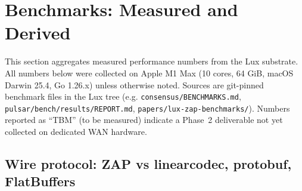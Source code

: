 
\section{Benchmarks: Measured and Derived}
\label{sec:benchmarks}

This section aggregates measured performance numbers from the Lux substrate.
All numbers below were collected on Apple M1 Max (10 cores, 64 GiB, macOS
Darwin 25.4, Go 1.26.x) unless otherwise noted. Sources are git-pinned
benchmark files in the Lux tree (e.g. \texttt{consensus/BENCHMARKS.md},
\texttt{pulsar/bench/results/REPORT.md},
\texttt{papers/lux-zap-benchmarks/}). Numbers reported as
``TBM'' (to be measured) indicate a Phase~2 deliverable not yet collected
on dedicated WAN hardware.

\subsection{Wire protocol: ZAP vs linearcodec, protobuf, FlatBuffers}

